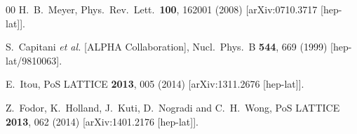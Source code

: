 \begin{thebibliography}{00}
  H.~B.~Meyer,
  Phys.\ Rev.\ Lett.\  {\bf 100}, 162001 (2008)
  [arXiv:0710.3717 [hep-lat]].

  S.~Capitani {\it et al.}  [ALPHA Collaboration],
  Nucl.\ Phys.\ B {\bf 544}, 669 (1999)
  [hep-lat/9810063].

  E.~Itou,
  PoS LATTICE {\bf 2013}, 005 (2014)
  [arXiv:1311.2676 [hep-lat]].

  Z.~Fodor, K.~Holland, J.~Kuti, D.~Nogradi and C.~H.~Wong,
  PoS LATTICE {\bf 2013}, 062 (2014)
  [arXiv:1401.2176 [hep-lat]].

\end{thebibliography}
